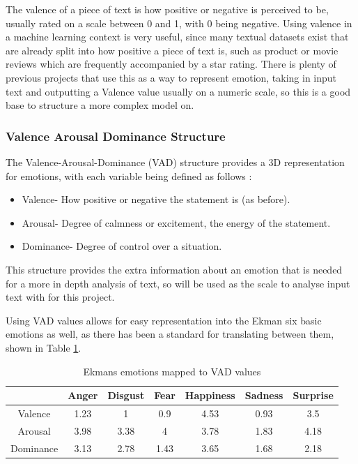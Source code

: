 The valence of a piece of text is how positive or negative is perceived to be, usually rated on a scale between 0 and 1, with 0 being negative.
Using valence in a machine learning context is very useful, since many textual datasets exist that are already split into how positive a piece of text is, such as product or movie reviews which are frequently accompanied by a star rating. There is plenty of previous projects that use this as a way to represent emotion, taking in input text and outputting a Valence value usually on a numeric scale, so this is a good base to structure a more complex model on.

\subsubsection{Valence Arousal Dominance Structure}

The Valence-Arousal-Dominance (VAD) structure provides a 3D representation for emotions, with each variable being defined as follows \cite{VAD}:
\begin{itemize}
    \item Valence- How positive or negative the statement is (as before).
    \item Arousal- Degree of calmness or excitement, the energy of the statement. 
    \item Dominance- Degree of control over a situation.
\end{itemize}

This structure provides the extra information about an emotion that is needed for a more in depth analysis of text, so will be used as the scale to analyse input text with for this project.

Using VAD values allows for easy representation into the Ekman six basic emotions as well, as there has been a standard for translating between them, shown in Table \ref{ekmansTable}.


\begin{table}[ht]
\caption{Ekmans emotions mapped to VAD values \cite{VADMapping}}
\centering
\begin{tabular}{ |c|c|c|c|c|c|c| } 
 \hline
  & Anger & Disgust & Fear & Happiness & Sadness & Surprise \\ 
 \hline                        
 Valence & 1.23 & 1 & 0.9 & 4.53 & 0.93 & 3.5\\ 
 Arousal & 3.98 & 3.38 & 4 & 3.78 & 1.83 & 4.18\\ 
 Dominance & 3.13 & 2.78 & 1.43 & 3.65 & 1.68 & 2.18\\ 
 \hline
\end{tabular}
\label{ekmansTable}
\end{table}


